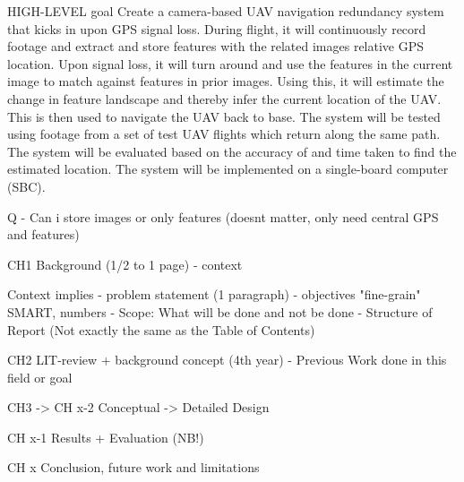 HIGH-LEVEL goal
Create a camera-based UAV navigation redundancy system that kicks in upon GPS signal loss. During flight, it will continuously record footage and extract and store features with the related images relative GPS location. Upon signal loss, it will turn around and use the features in the current image to match against features in prior images. Using this, it will estimate the change in feature landscape and thereby infer the current location of the UAV. This is then used to navigate the UAV back to base. The system will be tested using footage from a set of test UAV flights which return along the same path. The system will be evaluated based on the accuracy of and time taken to find the estimated location. The system will be implemented on a single-board computer (SBC). 


Q - Can i store images or only features (doesnt matter, only need central GPS and features)

CH1
 Background (1/2 to 1 page) - context

Context implies 
- problem statement (1 paragraph)
- objectives "fine-grain" SMART, numbers
- Scope: What will be done and not be done
- Structure of Report (Not exactly the same as the Table of Contents)


CH2
LIT-review + background concept (4th year)
- Previous Work done in this field or goal


CH3 -> CH x-2
Conceptual -> Detailed Design

CH x-1
Results + Evaluation (NB!)

CH x
Conclusion, future work and limitations
